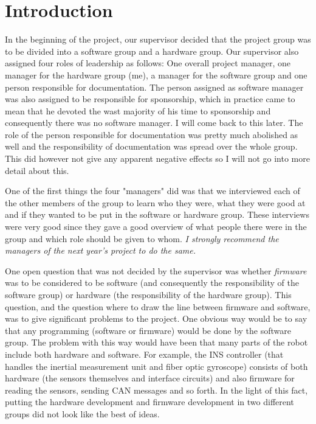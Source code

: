 
\section{Introduction}\label{sec:introduction}
In the beginning of the project, our supervisor decided that the project group was to be divided into a software group and a hardware group. Our supervisor also assigned four roles of leadership as follows: One overall project manager, one manager for the hardware group (me), a manager for the software group and one person responsible for documentation. \newline
The person assigned as software manager was also assigned to be responsible for sponsorship, which in practice came to mean that he devoted the wast majority of his time to sponsorship and consequently there was no software manager. I will come back to this later. \newline
The role of the person responsible for documentation was pretty much abolished as well and the responsibility of documentation was spread over the whole group. This did however not give any apparent negative effects so I will not go into more detail about this.

One of the first things the four "managers" did was that we interviewed each of the other members of the group to learn who they were, what they were good at and if they wanted to be put in the software or hardware group. These interviews were very good since they gave a good overview of what people there were in the group and which role should be given to whom. \emph{I strongly recommend the managers of the next year's project to do the same.}

One open question that was not decided by the supervisor was whether \emph{firmware} was to be considered to be software (and consequently the responsibility of the software group) or hardware (the responsibility of the hardware group). This question, and the question where to draw the line between firmware and software, was to give significant problems to the project. \newline
One obvious way would be to say that any programming (software or firmware) would be done by the software group. The problem with this way would have been that many parts of the robot include both hardware and software. For example, the INS controller (that handles the inertial measurement unit and fiber optic gyroscope) consists of both hardware (the sensors themselves and interface circuits) and also firmware for reading the sensors, sending CAN messages and so forth. In the light of this fact, putting the hardware development and firmware development in two different groups did not look like the best of ideas.

